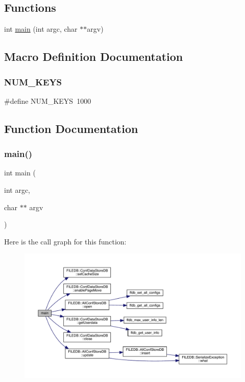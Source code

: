 \subsection*{Functions}
\begin{DoxyCompactItemize}
\item 
int \mbox{\hyperlink{adat-devel_2other__libs_2filedb_2src_2AllConfUpdateTest_8cpp_a3c04138a5bfe5d72780bb7e82a18e627}{main}} (int argc, char $\ast$$\ast$argv)
\end{DoxyCompactItemize}


\subsection{Macro Definition Documentation}
\mbox{\label{adat-devel_2other__libs_2filedb_2src_2AllConfUpdateTest_8cpp_a9a8c7403a867e0c9543467ee8754050d}} 
\subsubsection{\texorpdfstring{NUM\_KEYS}{NUM\_KEYS}}
{\footnotesize\ttfamily \#define N\+U\+M\+\_\+\+K\+E\+YS~1000}



\subsection{Function Documentation}
\mbox{\label{adat-devel_2other__libs_2filedb_2src_2AllConfUpdateTest_8cpp_a3c04138a5bfe5d72780bb7e82a18e627}} 
\subsubsection{\texorpdfstring{main()}{main()}}
{\footnotesize\ttfamily int main (\begin{DoxyParamCaption}\item[{int}]{argc,  }\item[{char $\ast$$\ast$}]{argv }\end{DoxyParamCaption})}

Here is the call graph for this function\+:
\nopagebreak
\begin{figure}[H]
\begin{center}
\leavevmode
\includegraphics[width=350pt]{d8/dc9/adat-devel_2other__libs_2filedb_2src_2AllConfUpdateTest_8cpp_a3c04138a5bfe5d72780bb7e82a18e627_cgraph}
\end{center}
\end{figure}
